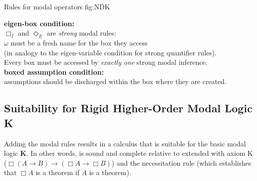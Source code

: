 \documentclass[smallextended]{svjour3}
\newcommand{\imp}{\rightarrow}
\newcommand{\nec}{\Box} %
\newcommand{\pos}{\Diamond} %
\begin{document}
\begin{calculus}
{Rules for modal operators}
{fig:NDK}

\vspace{1em}

\s\s\s\s
\infer[\nec_I]{\nec A}{\omega: \fbox{\infer*{A}{}} }
\s\s\s\s
\infer[\nec_E]{w: \fbox{ \infer*{}{A} } }{\nec A}

\vspace{2em}

\s\s\s\s
\infer[\pos_I]{\pos A}{w: \fbox{\infer*{A}{}} }
\s\s\s\s
\infer[\pos_E]{\omega: \fbox{ \infer*{}{A} } }{\pos A}

\vspace{1em}


\begin{center}
\textbf{eigen-box condition:}\\ 
$\nec_I$ and $\pos_E$ are \emph{strong} modal rules: \\
$\omega$ must be a fresh name for the box they access \\ 
(in analogy to the eigen-variable condition for strong quantifier rules). \\
Every box must be accessed by \emph{exactly one} strong modal inference. \\
\vspace{0.5em}
\textbf{boxed assumption condition:} \\
assumptions should be discharged within the box where they are created.
\end{center}

\vspace{1em}

\end{calculus}


\subsection{Suitability for Rigid Higher-Order Modal Logic K}\label{sec:compl-sound}

Adding the modal rules results in a calculus that is suitable for the basic modal logic \textbf{K}.
In other words, {\NDK} is sound and complete relative to {\ND} extended with axiom K ($\nec(A\imp B)\imp (\nec A\imp \nec B)$) and the necessitation rule (which establishes that $\nec A$ is a theorem if $A$ is a theorem).
\end{document}
